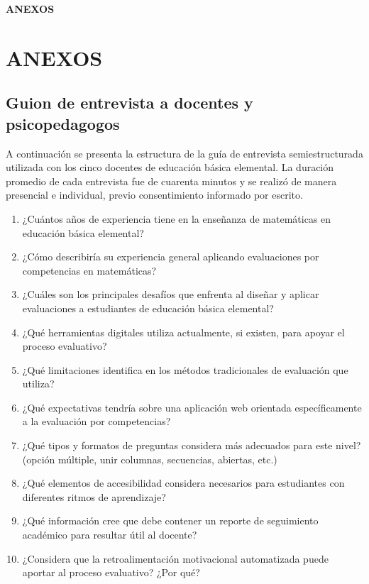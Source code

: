 
\cleardoublepage
\thispagestyle{empty}
\vspace*{\fill}
\begin{center}
{\Huge\bfseries ANEXOS}
\end{center}
\vspace*{\fill}
\clearpage

\chapter*{ANEXOS}
\setcounter{section}{0}

\renewcommand{\thesection}{Anexo \Alph{section}}

\section{Guion de entrevista a docentes y psicopedagogos}

A continuación se presenta la estructura de la guía de entrevista semiestructurada utilizada con los cinco docentes de educación básica elemental. La duración promedio de cada entrevista fue de cuarenta minutos y se realizó de manera presencial e individual, previo consentimiento informado por escrito.

\begin{enumerate}[leftmargin=*]
\item ¿Cuántos años de experiencia tiene en la enseñanza de matemáticas en educación básica elemental?
\item ¿Cómo describiría su experiencia general aplicando evaluaciones por competencias en matemáticas?
\item ¿Cuáles son los principales desafíos que enfrenta al diseñar y aplicar evaluaciones a estudiantes de educación básica elemental?
\item ¿Qué herramientas digitales utiliza actualmente, si existen, para apoyar el proceso evaluativo?
\item ¿Qué limitaciones identifica en los métodos tradicionales de evaluación que utiliza?
\item ¿Qué expectativas tendría sobre una aplicación web orientada específicamente a la evaluación por competencias?
\item ¿Qué tipos y formatos de preguntas considera más adecuados para este nivel? (opción múltiple, unir columnas, secuencias, abiertas, etc.)
\item ¿Qué elementos de accesibilidad considera necesarios para estudiantes con diferentes ritmos de aprendizaje?
\item ¿Qué información cree que debe contener un reporte de seguimiento académico para resultar útil al docente?
\item ¿Considera que la retroalimentación motivacional automatizada puede aportar al proceso evaluativo? ¿Por qué?
\end{enumerate}

